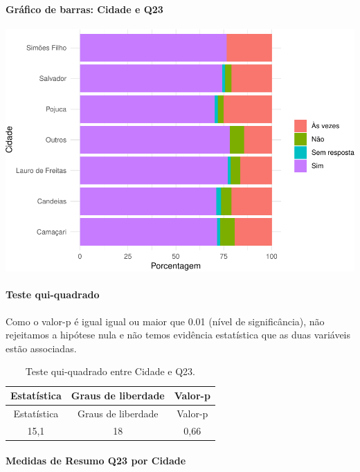 \documentclass[]{article}
\let\oldparagraph\paragraph
\renewcommand{\paragraph}[1]{\oldparagraph{#1}\mbox{}}
\begin{document}
\hypertarget{gruxe1fico-de-barras-cidade-e-q23}{%
\paragraph{Gráfico de barras: Cidade e Q23}\label{gruxe1fico-de-barras-cidade-e-q23}}

\begin{center}\includegraphics[width=0.75\linewidth]{relatorio_covid19_files/figure-latex/unnamed-chunk-545-1} \end{center}

\hypertarget{teste-qui-quadrado-47}{%
\paragraph{Teste qui-quadrado}\label{teste-qui-quadrado-47}}

Como o valor-p é igual igual ou maior que 0.01 (nível de significância), não rejeitamos a hipótese nula e não temos evidência estatística que as duas variáveis estão associadas.

\begin{longtable}[]{@{}ccc@{}}
\caption{\label{tab:unnamed-chunk-547}Teste qui-quadrado entre Cidade e Q23.}\tabularnewline
\toprule
Estatística & Graus de liberdade & Valor-p\tabularnewline
\midrule
\endfirsthead
\toprule
Estatística & Graus de liberdade & Valor-p\tabularnewline
\midrule
\endhead
15,1 & 18 & 0,66\tabularnewline
\bottomrule
\end{longtable}

\cleardoublepage

\hypertarget{medidas-de-resumo-q23-por-cidade}{%
\paragraph{Medidas de Resumo Q23 por Cidade}\label{medidas-de-resumo-q23-por-cidade}}
\end{document}
